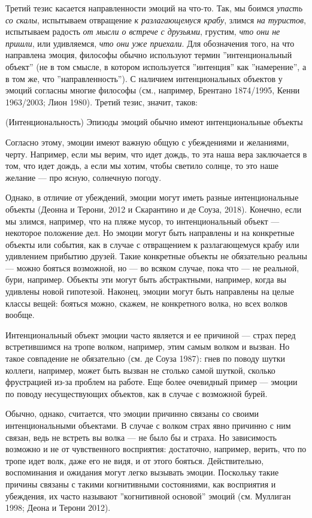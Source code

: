 \documentclass[11pt]{book}
\begin{document}
Третий тезис касается направленности эмоций на что-то. Так, мы боимся \textit{упасть со скалы}, испытываем отвращение \textit{к разлагающемуся крабу}, злимся \textit{на туристов}, испытываем радость \textit{от мысли о встрече с друзьями}, грустим, \textit{что они не пришли}, или удивляемся, \textit{что они уже приехали}. Для обозначения того, на что направлена эмоция, философы обычно используют термин ''интенциональный объект'' (не в том смысле, в котором используется ''интенция'' как ''намерение'', а в том же, что ''направленность''). С наличием интенциональных объектов у эмоций согласны многие философы (см., например, Брентано 1874/1995, Кенни 1963/2003; Лион 1980). Третий тезис, значит, таков:

\smallskip

(Интенциональность) Эпизоды эмоций обычно имеют интенциональные объекты

\smallskip

Согласно этому, эмоции имеют важную общую с убеждениями и желаниями, черту. Например, если мы верим, что идет дождь, то эта наша вера заключается в том, что идет дождь, а если мы хотим, чтобы светило солнце, то это наше желание --- про ясную, солнечную погоду.

Однако, в отличие от убеждений, эмоции могут иметь разные интенциональные объекты (Деонна и Терони, 2012 и Скарантино и де Соуза, 2018). Конечно, если мы злимся, например, что на пляже мусор, то интенциональный объект --- некоторое положение дел. Но эмоции могут быть направлены и на конкретные объекты или события, как в случае с отвращением к разлагающемуся крабу или удивлением прибытию друзей. Такие конкретные объекты не обязательно реальны --- можно бояться возможной, но --- во всяком случае, пока что --- не реальной, бури, например. Объекты эти могут быть абстрактными, например, когда вы удивлены новой гипотезой. Наконец, эмоции могут быть направлены на целые классы вещей: бояться можно, скажем, не конкретного волка, но всех волков вообще.

Интенциональный объект эмоции часто является и ее причиной --- страх перед встретившимся на тропе волком, например, этим самым волком и вызван. Но такое совпадение не обязательно (см. де Соуза 1987): гнев по поводу шутки коллеги, например, может быть вызван не столько самой шуткой, сколько фрустрацией из-за проблем на работе. Еще более очевидный пример --- эмоции по поводу несуществующих объектов, как в случае с возможной бурей.

Обычно, однако, считается, что эмоции причинно связаны со своими интенциональными объектами. В случае с волком страх явно причинно с ним связан, ведь не встреть вы волка --- не было бы и страха. Но зависимость возможно и не от чувственного восприятия: достаточно, например, верить, что по тропе идет волк, даже его не видя, и от этого бояться. Действительно, воспоминания и ожидания могут легко вызывать эмоции. Поскольку такие причины связаны с такими когнитивными состояниями, как восприятия и убеждения, их часто называют ''когнитивной основой'' эмоций (см. Муллиган 1998; Деона и Терони 2012).
\end{document}
